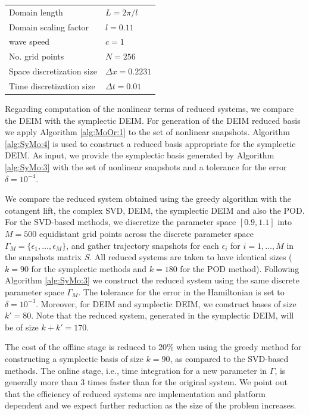 \vspace{0.5cm}
\begin{center}
\begin{tabular}{|l|l|}
\hline
Domain length & $L = 2\pi /l$ \\
Domain scaling factor & $l = 0.11$ \\
wave speed & $c =1$\\
No. grid points & $N = 256$ \\
Space discretization size & $\Delta x = 0.2231$ \\
Time discretization size & $\Delta t = 0.01$ \\
\hline
\end{tabular}
\end{center}
\vspace{0.5cm}
Regarding computation of the nonlinear terms of reduced systems, {\edit we} compare the DEIM with the symplectic DEIM. For generation of the DEIM reduced basis we apply Algorithm \ref{alg:MoOr:1} to the set of nonlinear snapshots. Algorithm \ref{alg:SyMo:4} is used to construct a reduced basis appropriate for the symplectic DEIM. As input, we provide the symplectic basis generated by Algorithm \ref{alg:SyMo:3} with the set of nonlinear snapshots and a tolerance for the error $\delta = 10^{-4}$.

We compare the reduced system obtained using the greedy algorithm with the cotangent lift, the complex SVD, DEIM, the symplectic DEIM and also the POD. For the SVD-based methods, we discretize the parameter space $[0.9,1.1]$ into $M=500$ equidistant grid points {\edit across} the discrete parameter space $\Gamma_M = \{\epsilon_1,\dots,\epsilon_M \}$, and gather trajectory snapshots for each $\epsilon_i$ for $i = 1,\dots,M$ in the snapshots matrix $S$. All reduced systems are taken to have identical sizes ($k=90$ for the symplectic methods and $k=180$ for the POD method). Following Algorithm \ref{alg:SyMo:3} we construct the reduced system using the same discrete parameter space $\Gamma_M$. The tolerance for the error in the Hamiltonian is set to $\delta = 10^{-3}$. Moreover, for DEIM and symplectic DEIM, we construct bases of size $k'=80$. Note that the reduced system, generated in the symplectic DEIM, will be of size $k+k'=170$.

The cost of the offline stage is reduced to 20\% when using the greedy method for constructing a symplectic basis of size $k=90$, as compared to the SVD-based methods. The online stage, i.e., time integration for a new parameter in $\Gamma$, is generally more than 3 times faster than {\edit for} the original system. We point out that the efficiency of reduced systems are implementation and platform dependent {\edit and we expect further reduction as the size of the problem increases.}


